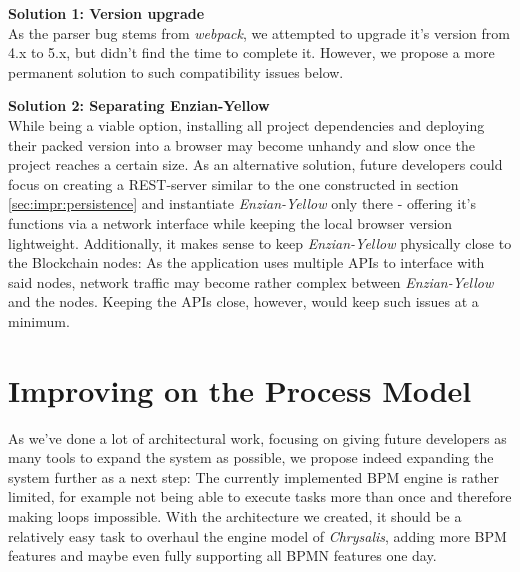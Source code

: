 \textbf{Solution 1: Version upgrade} \\[0.2em]
As the parser bug stems from \emph{webpack}, we attempted to upgrade it's version from 4.x to 5.x, but didn't find the time to complete it. However, we propose a more permanent solution to such compatibility issues below.

\textbf{Solution 2: Separating Enzian-Yellow} \\[0.2em]
While being a viable option, installing all project dependencies and deploying their packed version into a browser may become unhandy and slow once the project reaches a certain size. As an alternative solution, future developers could focus on creating a REST-server similar to the one constructed in section \ref{sec:impr:persistence} and instantiate \emph{Enzian-Yellow} only there - offering it's functions via a network interface while keeping the local browser version lightweight. \newline
Additionally, it makes sense to keep \emph{Enzian-Yellow} physically close to the Blockchain nodes: As the application uses multiple APIs to interface with said nodes, network traffic may become rather complex between \emph{Enzian-Yellow} and the nodes. Keeping the APIs close, however, would keep such issues at a minimum.

\section{Improving on the Process Model}
\label{sec:issues:bpm}

As we've done a lot of architectural work, focusing on giving future developers as many tools to expand the system as possible, we propose indeed expanding the system further as a next step: The currently implemented BPM engine is rather limited, for example not being able to execute tasks more than once and therefore making loops impossible. \newline
With the architecture we created, it should be a relatively easy task to overhaul the engine model of \emph{Chrysalis}, adding more BPM features and maybe even fully supporting all BPMN features one day.